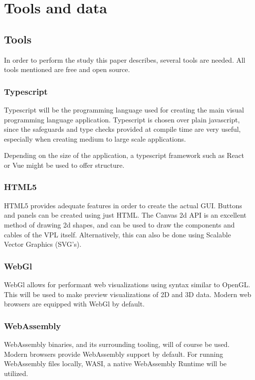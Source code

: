 \newpage
\section{Tools and data}

\subsection{Tools}
In order to perform the study this paper describes, several tools are needed. All tools mentioned are free and open source.

\subsubsection*{Typescript}
Typescript will be the programming language used for creating the main visual programming language application. Typescript is chosen over plain javascript, since the safeguards and type checks provided at compile time are very useful, especially when creating medium to large scale applications. 

Depending on the size of the application, a typescript framework such as React or Vue might be used to offer structure.

\subsubsection*{HTML5}
HTML5 provides adequate features in order to create the actual GUI. Buttons and panels can be created using just HTML. The Canvas 2d API is an excellent method of drawing 2d shapes, and can be used to draw the components and cables of the VPL itself. Alternatively, this can also be done using Scalable Vector Graphics (SVG's). 

\subsubsection*{WebGl}
WebGl allows for performant web visualizations using syntax similar to OpenGL. This will be used to make preview visualizations of 2D and 3D data. Modern web browsers are equipped with WebGl by default. 

\subsubsection*{WebAssembly}
WebAssembly binaries, and its surrounding tooling, will of course be used. Modern browsers provide WebAssembly support by default. For running WebAssembly files locally, WASI, a native WebAssembly Runtime will be utilized. 

